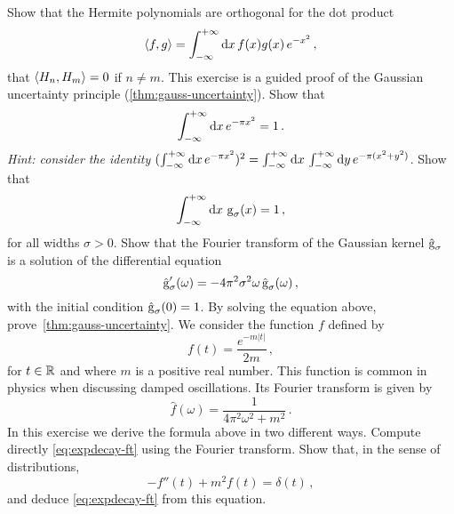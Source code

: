 \begin{ExerciseList}
  \Question Show that the Hermite polynomials are orthogonal for the dot product
  \begin{equation}
    \braket{f,g}=\int_{-\infty}^{+\infty}\mathrm{d}{x}\,f(x)g(x)\,e^{-x^2}\,,
  \end{equation}
  \ie that $\braket{H_n,H_m}=0$ if $n\neq m$.
  \Exercise[label=gauss-uncertainty]
  This exercise is a guided proof of the
  Gaussian uncertainty principle (\cref{thm:gauss-uncertainty}).
  \Question Show that
  \begin{equation}
    \int_{-\infty}^{+\infty}\mathrm{d}{x}\,e^{-\pi x^2}=1\,.
  \end{equation}
  \emph{Hint: consider the identity }
  $(\int_{-\infty}^{+\infty}\mathrm{d}{x}\,e^{-\pi x^2})^2=\int_{-\infty}^{+\infty}\mathrm{d}{x}\,\int_{-\infty}^{+\infty}\mathrm{d}{y}\,e^{-\pi (x^2+y^2)}$.
  \Question Show that
  \begin{equation}
    \int_{-\infty}^{+\infty}\mathrm{d}{x}\,\operatorname{g}_{\sigma}(x)=1\,,
  \end{equation}
  for all widths $\sigma>0$.
  \Question Show that the Fourier transform of the Gaussian kernel $\hat{\operatorname{g}}_{\sigma}$
  is a solution of the differential equation
  \begin{equation}
    \hat{\operatorname{g}}_{\sigma}'(\omega)=-4\pi^2\sigma^2\omega\,\hat{\operatorname{g}}_{\sigma}(\omega)\,,
  \end{equation}
  with the initial condition $\hat{\operatorname{g}}_{\sigma}(0)=1$.
  \Question By solving the equation above, prove~\cref{thm:gauss-uncertainty}.
  \Exercise[label=exp-decay]
  We consider the function $f$ defined by
  \begin{equation}
    f(t)=\frac{e^{-m|t|}}{2m}\,,
  \end{equation}
  for $t\in\mathbb{R}$ and where $m$ is a positive real number. This function is common in physics
  when discussing damped oscillations. Its Fourier transform is given by
  \begin{equation}
    \hat{f}(\omega)=\frac{1}{4\pi^2\omega^2+m^2}\,.
    \label{eq:expdecay-ft}
  \end{equation}
  In this exercise we derive the formula above in two different ways.
  \Question Compute directly \cref{eq:expdecay-ft} using the Fourier transform.
  \Question Show that, in the sense of distributions,
  \begin{equation}
    -f''(t)+m^2f(t)=\delta(t)\,,
  \end{equation}
  and deduce \cref{eq:expdecay-ft} from this equation.
\end{ExerciseList}
